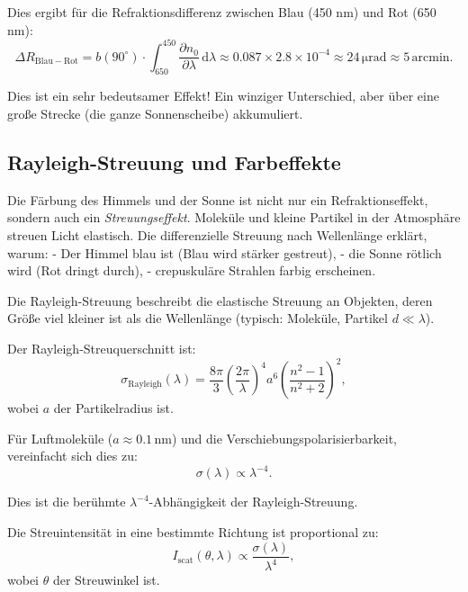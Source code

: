 \documentclass[12pt,a4paper]{article}
\providecommand{\SI}[2]{\ensuremath{#1\,#2}}
\providecommand{\ang}[1]{\ensuremath{#1\,\mathrm{arcmin}}}
\providecommand{\micro}{\mathrm{\mu}}
\providecommand{\nano}{\mathrm{n}}
\providecommand{\metre}{\mathrm{m}}
\providecommand{\radian}{\mathrm{rad}}
\begin{document}
Dies ergibt für die Refraktionsdifferenz zwischen Blau (450 nm) und Rot (650 nm):
\begin{equation}
  \Delta R_{\mathrm{Blau-Rot}} = b(90^\circ) \cdot \int_{650}^{450} \frac{\partial n_0}{\partial \lambda} \, \mathrm{d}\lambda
	\approx 0.087 \times 2.8 \times 10^{-4} \approx \boxed{\SI{24}{\micro\radian} \approx \ang{5}}.
	\label{eq:delta_R_br}
\end{equation}

Dies ist ein sehr bedeutsamer Effekt! Ein winziger Unterschied, aber
über eine große Strecke (die ganze Sonnenscheibe) akkumuliert.

\subsection{Rayleigh-Streuung und Farbeffekte}
\label{subsec:rayleigh}

Die Färbung des Himmels und der Sonne ist nicht nur ein Refraktionseffekt,
sondern auch ein \emph{Streuungseffekt}. Moleküle und kleine Partikel
in der Atmosphäre streuen Licht elastisch. Die differenzielle Streuung
nach Wellenlänge erklärt, warum:
- Der Himmel blau ist (Blau wird stärker gestreut),
- die Sonne rötlich wird (Rot dringt durch),
- crepuskuläre Strahlen farbig erscheinen.

Die Rayleigh-Streuung beschreibt die elastische Streuung an Objekten,
deren Größe viel kleiner ist als die Wellenlänge (typisch: Moleküle,
Partikel $d \ll \lambda$).

Der Rayleigh-Streuquerschnitt ist:
\begin{equation}
	\sigma_{\mathrm{Rayleigh}}(\lambda) = \frac{8\pi}{3} \left(\frac{2\pi}{\lambda}\right)^4 a^6 \left(\frac{n^2-1}{n^2+2}\right)^2,
	\label{eq:rayleigh_sigma}
\end{equation}
wobei $a$ der Partikelradius ist.

Für Luftmoleküle ($a \approx \SI{0.1}{\nano\metre}$) und die Verschiebungspolarisierbarkeit,
vereinfacht sich dies zu:
\begin{equation}
	\sigma(\lambda) \propto \lambda^{-4}.
	\label{eq:sigma_lambda4}
\end{equation}

Dies ist die berühmte $\lambda^{-4}$-Abhängigkeit der Rayleigh-Streuung.

Die Streuintensität in eine bestimmte Richtung ist proportional zu:
\begin{equation}
	I_{\mathrm{scat}}(\theta, \lambda) \propto \frac{\sigma(\lambda)}{\lambda^4},
	\label{eq:I_scat}
\end{equation}
wobei $\theta$ der Streuwinkel ist.
\end{document}
